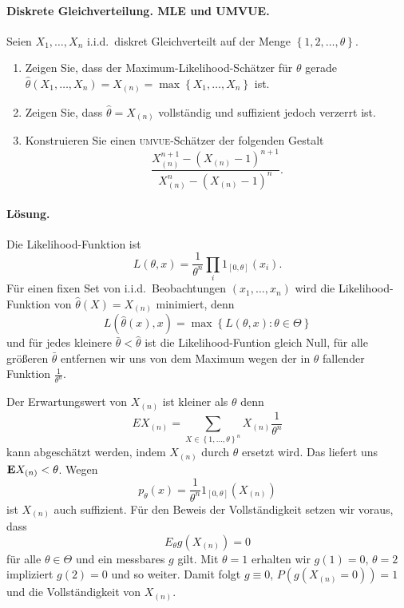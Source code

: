 \paragraph{Diskrete Gleichverteilung. MLE und UMVUE.} Seien $X_1,\ldots,X_n$ i.i.d.\ 
diskret Gleichverteilt auf der Menge $\left\{ 1,2,\ldots,\theta \right\}$. 
\begin{enumerate}
    \item Zeigen Sie, dass der Maximum-Likelihood-Schätzer für $\theta$ gerade
        $\hat \theta(X_1,\ldots,X_n) = X_{(n)} = \max \left\{ X_1,\ldots,X_n
        \right\}$ ist.  
    \item Zeigen Sie, dass $\hat \theta = X_{(n)}$ vollständig und suffizient
        jedoch verzerrt ist.
    \item Konstruieren Sie einen \textsc{umvue}-Schätzer der folgenden Gestalt
        \begin{equation*}
            \frac{ X_{(n)}^{n+1} - ( X_{(n)} - 1)^{n+1}  }{ X_{(n)}^n - (X_{(n)} -1)^n }.
        \end{equation*}
\end{enumerate}

\paragraph*{Lösung.}
Die Likelihood-Funktion ist
\begin{equation*}
    L(\theta,x) = \frac{1}{\theta^n} \prod_i 1_{[0,\theta]}(x_i).
\end{equation*}
Für einen fixen Set von i.i.d.\ Beobachtungen $(x_1,\ldots,x_n)$ wird die
Likelihood-Funktion von $\hat\theta(X)=X_{(n)}$ minimiert, denn
\begin{equation*}
    L(\hat\theta(x),x) = \max \left\{ L(\theta,x) : \theta\in\Theta \right\}
\end{equation*}
und für jedes kleinere $\bar\theta<\hat\theta$ ist die Likelihood-Funtion
gleich Null, für alle größeren $\bar\theta$ entfernen wir uns von dem Maximum
wegen der in $\theta$ fallender Funktion $\frac{1}{\theta^n}$.

Der Erwartungswert von $X_{(n)}$ ist kleiner als $\theta$ denn 
\begin{equation*}
    E X_{(n)} = \sum_{X\in\left\{ 1,\ldots,\theta \right\}^n}^{} X_{(n)} \frac{1}{\theta^n}
\end{equation*}
kann abgeschätzt werden, indem $X_{(n)}$ durch $\theta$ ersetzt wird. Das liefert uns
$\mathbf{E} X_{(n)} < \theta$. Wegen
\begin{equation*}
    p_\theta(x) = \frac{1}{\theta^n} 1_{[0,\theta]} \left( X_{(n)} \right)
\end{equation*}
ist $X_{(n)}$ auch suffizient. Für den Beweis der Vollständigkeit setzen wir voraus, dass 
\begin{equation*}
    E_{\theta} g(X_{(n)}) =0
\end{equation*}
für alle $\theta\in\Theta$ und ein messbares $g$ gilt.  Mit $\theta=1$ erhalten
wir $g(1)=0$, $\theta=2$ impliziert $g(2)=0$ und so weiter. Damit folgt $g
\equiv 0$, $P( g(X_{(n)} =0))=1$ und die Vollständigkeit von $X_{(n)}$.

